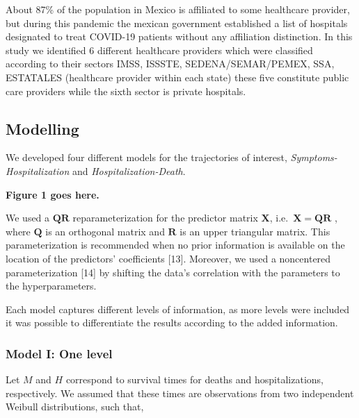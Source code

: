 \documentclass[10pt,letterpaper]{article}
\begin{document}
About 87\% of the population in Mexico is affiliated to some healthcare
provider, but during this pandemic the mexican government established a
list of hospitals designated to treat COVID-19 patients without any
affiliation distinction. In this study we identified 6 different
healthcare providers which were classified according to their sectors
IMSS, ISSSTE, SEDENA/SEMAR/PEMEX, SSA, ESTATALES (healthcare provider
within each state) these five constitute public care providers while the
sixth sector is private hospitals.

\hypertarget{modelling}{%
\subsection{Modelling}\label{modelling}}

We developed four different models for the trajectories of interest,
\emph{Symptoms-Hospitalization} and \emph{Hospitalization-Death}.
\vspace{5mm}

\begin{center}
\textbf{Figure 1 goes here.}
\end{center}

\vspace{5mm}

We used a \(\mathbf{QR}\) reparameterization for the predictor matrix
\(\mathbf{X}\), i.e.~\(\mathbf{X}=\mathbf{QR}\) , where \(\mathbf{Q}\)
is an orthogonal matrix and \(\mathbf{R}\) is an upper triangular
matrix. This parameterization is recommended when no prior information
is available on the location of the predictors' coefficients {[}13{]}.
Moreover, we used a noncentered parameterization {[}14{]} by shifting
the data's correlation with the parameters to the hyperparameters.

Each model captures different levels of information, as more levels were
included it was possible to differentiate the results according to the
added information.

\hypertarget{model-i-one-level}{%
\subsubsection{Model I: One level}\label{model-i-one-level}}

Let \(M\) and \(H\) correspond to survival times for deaths and
hospitalizations, respectively. We assumed that these times are
observations from two independent Weibull distributions, such that,
\end{document}
